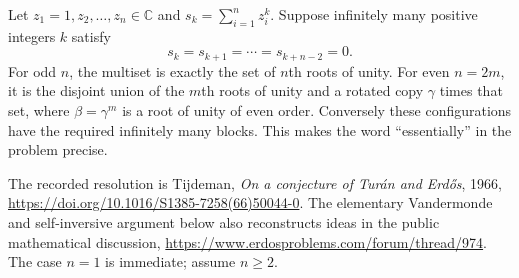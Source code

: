 Let $z_1=1,z_2,\ldots,z_n\in\mathbb C$ and $s_k=\sum_{i=1}^n z_i^k$. Suppose infinitely many positive integers $k$ satisfy
\[
 s_k=s_{k+1}=\cdots=s_{k+n-2}=0.
\]
For odd $n$, the multiset is exactly the set of $n$th roots of unity. For even $n=2m$, it is the disjoint union of the $m$th roots of unity and a rotated copy $\gamma$ times that set, where $\beta=\gamma^m$ is a root of unity of even order. Conversely these configurations have the required infinitely many blocks. This makes the word ``essentially'' in the problem precise.

The recorded resolution is Tijdeman, \emph{On a conjecture of Tur\'an and Erd\H{o}s}, 1966, \url{https://doi.org/10.1016/S1385-7258(66)50044-0}. The elementary Vandermonde and self-inversive argument below also reconstructs ideas in the public mathematical discussion, \url{https://www.erdosproblems.com/forum/thread/974}. The case $n=1$ is immediate; assume $n\ge2$.
